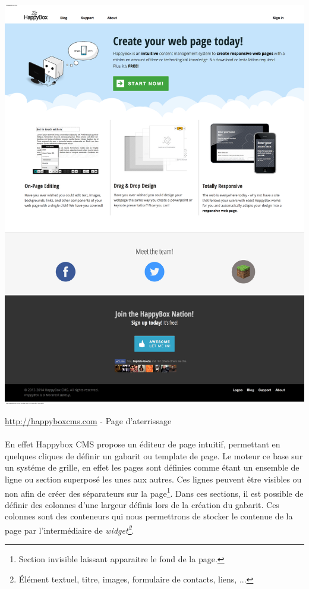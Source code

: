 \documentclass[11pt, a4paper ]{article}
\begin{document}
\begin{spacing}{1.5}
\begin{center}
		\includegraphics[width=\textwidth]{images/HBscreen/fullLanding.png}
		\caption{\url{http://happyboxcms.com} - Page d'aterrissage}
\end{center}

\paragraph{}
En effet Happybox CMS propose un éditeur de page intuitif, permettant en quelques cliques de définir un gabarit ou template de page. Le moteur ce base sur un systéme de grille, en effet les pages sont définies comme étant un ensemble de ligne ou section superposé les unes aux autres. Ces lignes peuvent être visibles ou non afin de créer des séparateurs sur la page\footnote{Section invisible laissant apparaitre le fond de la page.}. Dans ces sections, il est possible de définir des colonnes d'une largeur définis lors de la création du gabarit. Ces colonnes sont des conteneurs qui nous permettrons de stocker le contenue de la page par l'intermédiaire de \emph{widget\footnote{Élément textuel, titre, images, formulaire de contacts, liens, ...}}.


\end{spacing}
\end{document}
